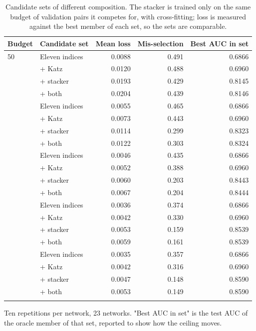 \begin{table}[htbp]
\centering
\scriptsize
\setlength{\tabcolsep}{4pt}
\caption{Candidate sets of different composition. The stacker is trained only on the same budget of validation pairs it competes for, with cross-fitting; loss is measured against the best member of each set, so the sets are comparable.}
\label{tab:expanded}
\begin{tabular}{l l r r r}
\toprule
Budget & Candidate set & Mean loss & Mis-selection & Best AUC in set \\
\midrule
50 & Eleven indices & 0.0088 & 0.491 & 0.6866 \\
 & + Katz & 0.0120 & 0.488 & 0.6960 \\
 & + stacker & 0.0193 & 0.429 & 0.8145 \\
 & + both & 0.0204 & 0.439 & 0.8146 \\
\addlinespace[2pt]
100 & Eleven indices & 0.0055 & 0.465 & 0.6866 \\
 & + Katz & 0.0073 & 0.443 & 0.6960 \\
 & + stacker & 0.0114 & 0.299 & 0.8323 \\
 & + both & 0.0122 & 0.303 & 0.8324 \\
\addlinespace[2pt]
200 & Eleven indices & 0.0046 & 0.435 & 0.6866 \\
 & + Katz & 0.0052 & 0.388 & 0.6960 \\
 & + stacker & 0.0060 & 0.203 & 0.8443 \\
 & + both & 0.0067 & 0.204 & 0.8444 \\
\addlinespace[2pt]
500 & Eleven indices & 0.0036 & 0.374 & 0.6866 \\
 & + Katz & 0.0042 & 0.330 & 0.6960 \\
 & + stacker & 0.0053 & 0.159 & 0.8539 \\
 & + both & 0.0059 & 0.161 & 0.8539 \\
\addlinespace[2pt]
1000 & Eleven indices & 0.0035 & 0.357 & 0.6866 \\
 & + Katz & 0.0042 & 0.316 & 0.6960 \\
 & + stacker & 0.0047 & 0.148 & 0.8590 \\
 & + both & 0.0053 & 0.149 & 0.8590 \\
\addlinespace[2pt]
\bottomrule
\end{tabular}
\par\vspace{2pt}\begin{minipage}{\linewidth}\footnotesize Ten repetitions per network, 23 networks. "Best AUC in set" is the test AUC of the oracle member of that set, reported to show how the ceiling moves.\end{minipage}
\end{table}
